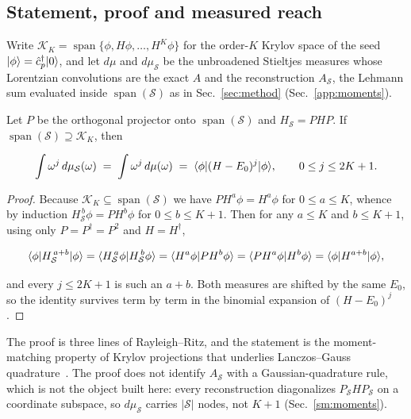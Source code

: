 \subsection{Statement, proof and measured reach}
\label{sec:moments:exact}

Write $\mathcal K_K=\operatorname{span}\{\phi,H\phi,\dots,H^{K}\phi\}$ for the order-$K$ Krylov space
of the seed $\lvert \phi \rangle=\hat c^{\dagger}_{p}\lvert 0 \rangle$, and let $d\mu$ and $d\mu_{\mathcal S}$ be the
unbroadened Stieltjes measures whose Lorentzian convolutions are the exact $A$ and the reconstruction
$A_{\mathcal S}$, the Lehmann sum evaluated inside $\operatorname{span}(\mathcal S)$ as in
Sec.~\ref{sec:method} (Sec.~\ref{app:moments}).

\begin{theorem}
\label{thm:moments}
Let $P$ be the orthogonal projector onto $\operatorname{span}(\mathcal S)$ and $H_{\mathcal S}=PHP$.
If $\operatorname{span}(\mathcal S)\supseteq\mathcal K_K$, then
\begin{widetext}
\begin{equation}
\int \omega^{j}\,d\mu_{\mathcal S}(\omega)\;=\;\int \omega^{j}\,d\mu(\omega)
\;=\;\braket{\phi|(H-E_0)^{j}|\phi},\qquad 0\le j\le 2K+1 .
\label{eq:momex}
\end{equation}
\end{widetext}
\end{theorem}

\begin{proof}
Because $\mathcal K_K\subseteq\operatorname{span}(\mathcal S)$ we have $PH^{a}\phi=H^{a}\phi$ for
$0\le a\le K$, whence by induction $H_{\mathcal S}^{\,b}\phi=P H^{b}\phi$ for $0\le b\le K+1$. Then for
any $a\le K$ and $b\le K+1$, using only $P=P^{\dagger}=P^{2}$ and $H=H^{\dagger}$,
\begin{widetext}
\begin{equation}
\braket{\phi|H_{\mathcal S}^{\,a+b}|\phi}=\braket{H_{\mathcal S}^{\,a}\phi|H_{\mathcal S}^{\,b}\phi}
=\braket{H^{a}\phi|P H^{b}\phi}=\braket{P H^{a}\phi|H^{b}\phi}=\braket{\phi|H^{a+b}|\phi},
\label{eq:rrsplit}
\end{equation}
\end{widetext}
and every $j\le 2K+1$ is such an $a+b$. Both measures are shifted by the same $E_0$, so the identity
survives term by term in the binomial expansion of $(H-E_0)^{j}$.
\end{proof}

\noindent The proof is three lines of Rayleigh--Ritz, and the statement is the moment-matching property
of Krylov projections that underlies Lanczos--Gauss quadrature~\cite{golub2010}. The proof does not identify $A_{\mathcal S}$ with a
Gaussian-quadrature rule, which is not the object built here: every reconstruction diagonalizes
$P_{\mathcal S}HP_{\mathcal S}$ on a coordinate subspace, so $d\mu_{\mathcal S}$ carries
$|\mathcal S|$ nodes, not $K+1$ (Sec.~\ref{sm:moments}).

